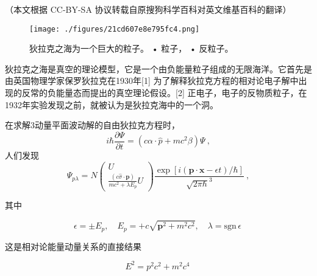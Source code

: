 
（本文根据 CC-BY-SA 协议转载自原搜狗科学百科对英文维基百科的翻译）

\begin{figure}[ht]
\centering
\texttt{[image: ./figures/21cd607e8e795fc4.png]}
\caption{狄拉克之海为一个巨大的粒子。 • 粒子， • 反粒子。} \label{fig_DLKZH_1}
\end{figure}

狄拉克之海是真空的理论模型，它是一个由负能量粒子组成的无限海洋。它首先是由英国物理学家保罗狄拉克在1930年[1] 为了解释狄拉克方程的相对论电子解中出现的反常的负能量态而提出的真空理论假设。[2] 正电子，电子的反物质粒子，在1932年实验发现之前，就被认为是狄拉克海中的一个洞。

在求解3动量平面波动解的自由狄拉克方程时，
$$i \hbar \frac{\partial \Psi}{\partial t} = (c \alpha \cdot \hat{p} + mc^2 \beta) \Psi~,$$
人们发现
$$\Psi_{p \lambda} = N \left( \begin{array}{c}    U \\    \frac{(c \hat{\sigma} \cdot \mathbf{p})}{mc^2 + \lambda E_p} U \end{array} \right)\frac{\exp\left[ i ( \mathbf{p} \cdot \mathbf{x} - \epsilon t ) / \hbar \right]}{\sqrt{2 \pi \hbar}^3}~,$$

其中

$$\epsilon = \pm E_p, \quad E_p = +c \sqrt{\mathbf{p}^2 + m^2 c^2}, \quad \lambda = \text{sgn} \, \epsilon~$$

这是相对论能量动量关系的直接结果

$$E^2 = p^2 c^2 + m^2 c^4~$$




